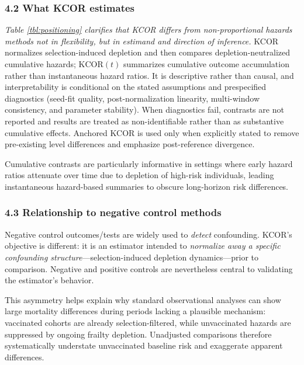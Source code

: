\documentclass[
]{article}
\begin{document}
\subsubsection{4.2 What KCOR estimates}\label{what-kcor-estimates}

\emph{Table \ref{tbl:positioning} clarifies that KCOR differs from
non-proportional hazards methods not in flexibility, but in estimand and
direction of inference.} KCOR normalizes selection-induced depletion and
then compares depletion-neutralized cumulative hazards;
\(\mathrm{KCOR}(t)\) summarizes cumulative outcome accumulation rather
than instantaneous hazard ratios. It is descriptive rather than causal,
and interpretability is conditional on the stated assumptions and
prespecified diagnostics (seed-fit quality, post-normalization
linearity, multi-window consistency, and parameter stability). When
diagnostics fail, contrasts are not reported and results are treated as
non-identifiable rather than as substantive cumulative effects. Anchored
KCOR is used only when explicitly stated to remove pre-existing level
differences and emphasize post-reference divergence.

Cumulative contrasts are particularly informative in settings where
early hazard ratios attenuate over time due to depletion of high-risk
individuals, leading instantaneous hazard-based summaries to obscure
long-horizon risk differences.

\subsubsection{4.3 Relationship to negative control
methods}\label{relationship-to-negative-control-methods}

Negative control outcomes/tests are widely used to \emph{detect}
confounding. KCOR's objective is different: it is an estimator intended
to \emph{normalize away a specific confounding
structure}---selection-induced depletion dynamics---prior to comparison.
Negative and positive controls are nevertheless central to validating
the estimator's behavior.

This asymmetry helps explain why standard observational analyses can
show large mortality differences during periods lacking a plausible
mechanism: vaccinated cohorts are already selection-filtered, while
unvaccinated hazards are suppressed by ongoing frailty depletion.
Unadjusted comparisons therefore systematically understate unvaccinated
baseline risk and exaggerate apparent differences.
\end{document}
